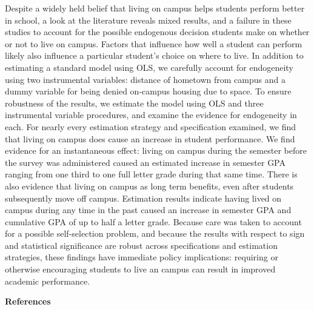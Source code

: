 \documentclass[12pt]{article}
\begin{document}
Despite a widely held belief that living on campus helps students perform better in school, a look at the literature reveals mixed results, and a failure in these studies to account for the possible endogenous decision students make on whether or not to live on campus.  Factors that influence how well a student can perform likely also influence a particular student's choice on where to live.  In addition to estimating a standard model using OLS, we carefully account for endogeneity using two instrumental variables: distance of hometown from campus and a dummy variable for being denied on-campus housing due to space.  To ensure robustness of the results, we estimate the model using OLS and three instrumental variable procedures, and examine the evidence for endogeneity in each.  For nearly every estimation strategy and specification examined, we find that living on campus does cause an increase in student performance.  We find evidence for an instantaneous effect: living on campus during the semester before the survey was administered caused an estimated increase in semester GPA ranging from one third to one full letter grade during that same time.  There is also evidence that living on campus as long term benefits, even after students subsequently move off campus.  Estimation results indicate having lived on campus during any time in the past caused an increase in semester GPA and cumulative GPA of up to half a letter grade.  Because care was taken to account for a possible self-selection problem, and because the results with respect to sign and statistical significance are robust across specifications and estimation strategies, these findings have immediate policy implications: requiring or otherwise encouraging students to live an campus can result in improved academic performance.

\newpage
\begin{center}\textbf{References}\end{center}
\vspace*{-0.9in}
\begin{singlespace}
\nocite{*}


\end{singlespace}
\end{document}
